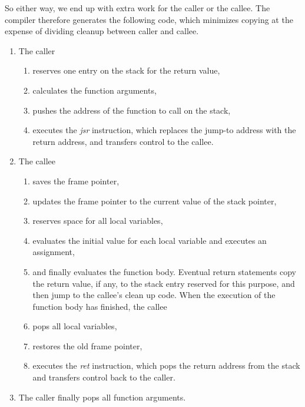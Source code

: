 \documentclass[a4paper]{article}
\begin{document}
So either way, we end up with extra work for the caller or the callee.  The
compiler therefore generates the following code, which minimizes copying at the
expense of dividing cleanup between caller and callee.

\begin{enumerate}

  \item The caller
    \begin{enumerate}

    \item reserves one entry on the stack for the return value,

    \item calculates the function arguments,

    \item pushes the address of the function to call on the stack,

    \item executes the \emph{jsr} instruction, which replaces the jump-to
          address with the return address, and transfers control to the callee.

  \end{enumerate}
  \item The callee
    \begin{enumerate}

    \item saves the frame pointer,

    \item updates the frame pointer to the current value of the stack pointer,

    \item reserves space for all local variables,

    \item evaluates the initial value for each local variable and executes an
          assignment,

    \item and finally evaluates the function body. Eventual return statements
    copy the return value, if any, to the stack entry reserved for this purpose,
    and then jump to the callee's clean up code.  When the execution of the function
    body has finished, the callee

    \item pops all local variables,

    \item restores the old frame pointer,

    \item executes the \emph{ret} instruction, which pops the return address
    from the stack and transfers control back to the caller.

    \end{enumerate}

  \item The caller finally pops all function arguments.

\end{enumerate}
\end{document}
